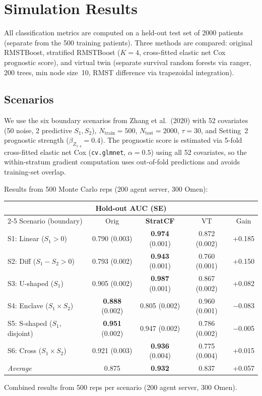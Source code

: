 \documentclass[11pt,letterpaper]{article}
\begin{document}
\section{Simulation Results}
\label{sec:results}

All classification metrics are computed on a held-out test set of 2000
patients (separate from the 500 training patients).  Three methods are
compared: original RMSTBoost, stratified RMSTBoost ($K=4$, cross-fitted
elastic net Cox prognostic score), and virtual twin (separate survival
random forests via ranger, 200 trees, min node size~10, RMST difference
via trapezoidal integration).

\subsection{Scenarios}

We use the six boundary scenarios from Zhang et al.\ (2020) with 52
covariates (50 noise, 2 predictive $S_1, S_2$), $N_{\text{train}} = 500$,
$N_{\text{test}} = 2000$, $\tau = 30$, and Setting~2 prognostic strength
($\beta_{Z_{1:4}} = 0.4$).  The prognostic score is estimated via
5-fold cross-fitted elastic net Cox (\texttt{cv.glmnet}, $\alpha=0.5$)
using all 52 covariates, so the within-stratum gradient computation uses
out-of-fold predictions and avoids training-set overlap.

Results from 500 Monte Carlo reps (200 agent server, 300 Omen):

\begin{center}
\begin{tabular}{lcccc}
\toprule
\multicolumn{5}{c}{Hold-out AUC (SE)} \\
\cmidrule{2-5}
Scenario (boundary) & Orig & \textbf{StratCF} & VT & Gain \\
\midrule
S1: Linear ($S_1 > 0$) & 0.790 (0.003) & \textbf{0.974} (0.001) & 0.872 (0.002) & +0.185 \\
S2: Diff ($S_1 - S_2 > 0$) & 0.793 (0.002) & \textbf{0.943} (0.001) & 0.760 (0.001) & +0.150 \\
S3: U-shaped ($S_1$) & 0.905 (0.002) & \textbf{0.987} (0.001) & 0.867 (0.002) & +0.082 \\
S4: Enclave ($S_1 \times S_2$) & \textbf{0.888} (0.002) & 0.805 (0.002) & 0.960 (0.001) & $-$0.083 \\
S5: S-shaped ($S_1$, disjoint) & \textbf{0.951} (0.002) & 0.947 (0.002) & 0.786 (0.002) & $-$0.005 \\
S6: Cross ($S_1 \times S_2$) & 0.921 (0.003) & \textbf{0.936} (0.004) & 0.775 (0.004) & +0.015 \\
\midrule
\emph{Average} & 0.875 & \textbf{0.932} & 0.837 & +0.057 \\
\bottomrule
\end{tabular}
\footnotesize Combined results from 500 reps per scenario (200 agent server, 300 Omen).
\end{center}
\end{document}
